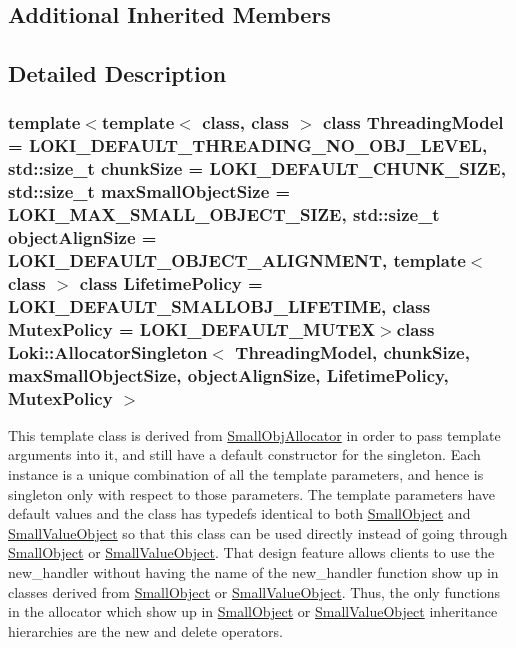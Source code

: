 \subsection*{Additional Inherited Members}


\subsection{Detailed Description}
\subsubsection*{template$<$template$<$ class, class $>$ class Threading\+Model = L\+O\+K\+I\+\_\+\+D\+E\+F\+A\+U\+L\+T\+\_\+\+T\+H\+R\+E\+A\+D\+I\+N\+G\+\_\+\+N\+O\+\_\+\+O\+B\+J\+\_\+\+L\+E\+V\+E\+L, std\+::size\+\_\+t chunk\+Size = L\+O\+K\+I\+\_\+\+D\+E\+F\+A\+U\+L\+T\+\_\+\+C\+H\+U\+N\+K\+\_\+\+S\+I\+Z\+E, std\+::size\+\_\+t max\+Small\+Object\+Size = L\+O\+K\+I\+\_\+\+M\+A\+X\+\_\+\+S\+M\+A\+L\+L\+\_\+\+O\+B\+J\+E\+C\+T\+\_\+\+S\+I\+Z\+E, std\+::size\+\_\+t object\+Align\+Size = L\+O\+K\+I\+\_\+\+D\+E\+F\+A\+U\+L\+T\+\_\+\+O\+B\+J\+E\+C\+T\+\_\+\+A\+L\+I\+G\+N\+M\+E\+N\+T, template$<$ class $>$ class Lifetime\+Policy = L\+O\+K\+I\+\_\+\+D\+E\+F\+A\+U\+L\+T\+\_\+\+S\+M\+A\+L\+L\+O\+B\+J\+\_\+\+L\+I\+F\+E\+T\+I\+M\+E, class Mutex\+Policy = L\+O\+K\+I\+\_\+\+D\+E\+F\+A\+U\+L\+T\+\_\+\+M\+U\+T\+E\+X$>$class Loki\+::\+Allocator\+Singleton$<$ Threading\+Model, chunk\+Size, max\+Small\+Object\+Size, object\+Align\+Size, Lifetime\+Policy, Mutex\+Policy $>$}

This template class is derived from \hyperlink{classLoki_1_1SmallObjAllocator}{Small\+Obj\+Allocator} in order to pass template arguments into it, and still have a default constructor for the singleton. Each instance is a unique combination of all the template parameters, and hence is singleton only with respect to those parameters. The template parameters have default values and the class has typedefs identical to both \hyperlink{classLoki_1_1SmallObject}{Small\+Object} and \hyperlink{classLoki_1_1SmallValueObject}{Small\+Value\+Object} so that this class can be used directly instead of going through \hyperlink{classLoki_1_1SmallObject}{Small\+Object} or \hyperlink{classLoki_1_1SmallValueObject}{Small\+Value\+Object}. That design feature allows clients to use the new\+\_\+handler without having the name of the new\+\_\+handler function show up in classes derived from \hyperlink{classLoki_1_1SmallObject}{Small\+Object} or \hyperlink{classLoki_1_1SmallValueObject}{Small\+Value\+Object}. Thus, the only functions in the allocator which show up in \hyperlink{classLoki_1_1SmallObject}{Small\+Object} or \hyperlink{classLoki_1_1SmallValueObject}{Small\+Value\+Object} inheritance hierarchies are the new and delete operators. 

